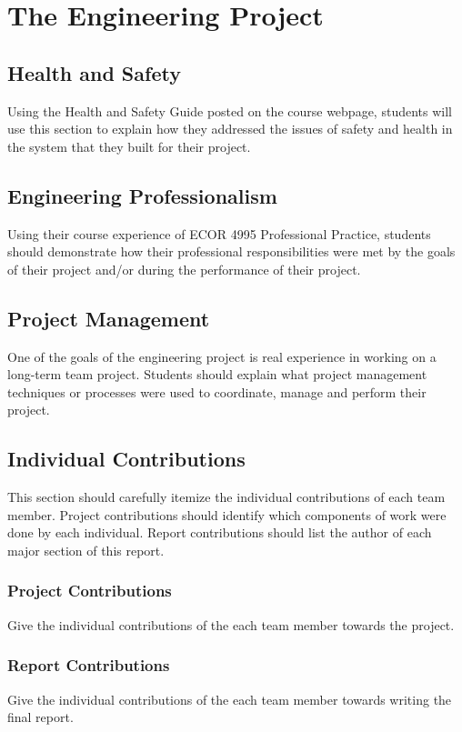 \documentclass[document.tex]{subfiles}
\begin{document}
\chapter{The Engineering Project}

\section{Health and Safety}

Using the Health and Safety Guide posted on the course webpage, students will use this section to explain how they addressed the issues of safety and health in the system that they built for their project.


\section{Engineering Professionalism}

Using their course experience of ECOR 4995 Professional Practice, students should demonstrate how their professional responsibilities were met by the goals of their project and/or during the performance of their project. 


\section{Project Management}

One of the goals of the engineering project is real experience in working on a long-term team project.  Students should explain what project management techniques or processes were used to coordinate, manage and perform their project.


\section{Individual Contributions}

This section should carefully itemize the individual contributions of each team member. Project contributions should identify which components of work were done by each individual.  Report contributions should list the author of each major section of this report.


\subsection{Project Contributions}

Give the individual contributions of the each team member towards the project.


\subsection{Report Contributions}

Give the individual contributions of the each team member towards writing the
final report.
\end{document}
